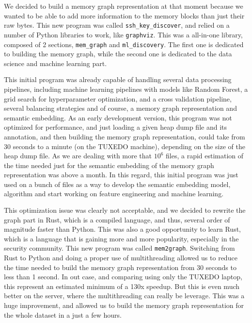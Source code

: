     We decided to build a memory graph representation at that moment because we wanted to be able to add more information to the memory blocks than just their raw bytes. This new program was called \texttt{ssh\_key\_discover}, and relied on a number of Python libraries to work, like \texttt{graphviz}. This was a all-in-one library, composed of 2 sections, \texttt{mem\_graph} and \texttt{ml\_discovery}. The first one is dedicated to building the memory graph, while the second one is dedicated to the data science and machine learning part.

    This initial program was already capable of handling several data processing pipelines, including machine learning pipelines with models like Random Forest, a grid search for hyperparameter optimization, and a cross validation pipeline, several balancing strategies and of course, a memory graph representation and semantic embedding. As an early development version, this program was not optimized for performance, and just loading a given heap dump file and its annotation, and then building the memory graph representation, could take from 30 seconds to a minute (on the TUXEDO machine), depending on the size of the heap dump file. As we are dealing with more that $ 10^{6} $ files, a rapid estimation of the time needed just for the semantic embedding of the memory graph representation was above a month. In this regard, this initial program was just used on a bunch of files as a way to develop the semantic embedding model, algorithm and start working on feature engineering and machine learning.
    
    This optimization issue was clearly not acceptable, and we decided to rewrite the graph part in Rust, which is a compiled language, and thus, several order of magnitude faster than Python. This was also a good opportunity to learn Rust, which is a language that is gaining more and more popularity, especially in the security community. This new program was called \texttt{mem2graph}. Switching from Rust to Python and doing a proper use of multithreading allowed us to reduce the time needed to build the memory graph representation from 30 seconds to less than 1 second. In out case, and comparing using only the TUXEDO laptop, this represent an estimated minimum of a 130x speedup. But this is even much better on the server, where the multithreading can really be leverage. This was a huge improvement, and allowed us to build the memory graph representation for the whole dataset in a just a few hours.

